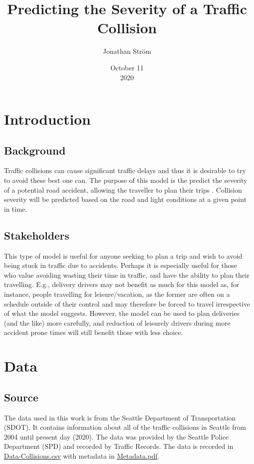 \documentclass[12pt,a4paper,oneside]{article}
\title{Predicting the Severity of a Traffic Collision}
\author{Jonathan Ström}
\date{October 11 \\ 2020}
\begin{document}
\maketitle

\section{Introduction}


\subsection{Background}

Traffic collisions can cause significant traffic delays and thus it is desirable to try to avoid these best one can. 
The purpose of this model is the predict the severity of a potential road accident, allowing the traveller to plan their trips . 
Collision severity will be predicted based on the road and light conditions at a given point in time. 

\subsection{Stakeholders}

This type of model is useful for anyone seeking to plan a trip and wish to avoid being stuck in traffic due to accidents. 
Perhaps it is especially useful for those who value avoiding wasting their time in traffic, and have the ability to plan their travelling. 
E.g., delivery drivers may not benefit as much for this model as, for instance, people travelling for leisure/vacation, as the former are often on a schedule outside of their control and may therefore be forced to travel irrespective of what the model suggests. 
However, the model can be used to plan deliveries (and the like) more carefully, and reduction of leisurely drivers during more accident prone times will still benefit those with less choice.

\section{Data}

\subsection{Source}

The data used in this work is from the Seattle Department of Transportation (SDOT). It contains information about all of the traffic collisions in Seattle from 2004 until present day (2020). The data was provided by the Seattle Police Department (SPD) and recorded by Traffic Records. The data is recorded in 
\href{https://github.com/jstr0em/coursera-capstone/blob/master/Data-Collisions.csv}{Data-Collisions.csv} with metadata in \href{https://github.com/jstr0em/coursera-capstone/blob/master/Metadata.pdf}{Metadata.pdf}.
\end{document}
